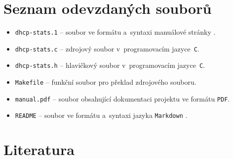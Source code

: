 \documentclass[a4paper, 11pt]{article}
\begin{document}
\newpage

\section{Seznam odevzdaných souborů}
\begin{itemize}
    \item \texttt{dhcp-stats.1} -- soubor ve formátu a~syntaxi manuálové stránky \cite{manpage}.
    \item \texttt{dhcp-stats.c} -- zdrojový soubor v~programovacím jazyce~\texttt{C}.
    \item \texttt{dhcp-stats.h} -- hlavičkový soubor v~programovacím jazyce~\texttt{C}.
    \item \texttt{Makefile} -- funkční soubor pro překlad zdrojového souboru.
    \item \texttt{manual.pdf} -- soubor obsahující dokumentaci projektu ve formátu \texttt{PDF}.
    \item \texttt{README} -- soubor ve formátu a~syntaxi jazyka \texttt{Markdown} \cite{markdown}.
\end{itemize}

\newpage

\section{Literatura}

\renewcommand{\refname}{}

\end{document}
